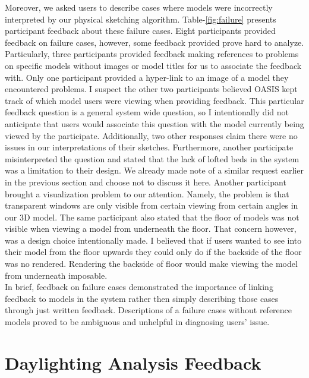 Moreover, we asked users to describe cases where models were incorrectly interpreted by our physical sketching algorithm.
Table-\ref{fig:failure} presents participant feedback about these failure cases.
Eight participants provided feedback on failure cases, however, some feedback provided prove hard to analyze.
Particularly, three participants provided feedback making references to problems on specific models without images or model titles for us to associate the feedback with.
Only one participant provided a hyper-link to an image of a model they encountered problems.
I suspect the other two participants believed OASIS kept track of which model users were viewing when providing feedback.
This particular feedback question is a general system wide question, so I intentionally did not anticipate that users would associate this question with the model currently being viewed by the participate.
Additionally, two other responses claim there were no issues in our interpretations of their sketches.
Furthermore, another participate misinterpreted the question and stated that the lack of lofted beds in the system was a limitation to their design.
We already made note of a similar request earlier in the previous section and choose not to discuss it here.
Another participant brought a visualization problem to our attention. 
Namely, the problem is that transparent windows are only visible from certain viewing from certain angles in our 3D model.
The same participant also stated that the floor of models was not visible when viewing a model from underneath the floor.
That concern however, was a design choice intentionally made.
I believed that if users wanted to see into their model from the floor upwards they could only do if the backside of the floor was no rendered.
Rendering the backside of floor would make viewing the model from underneath imposable.\\

In brief, feedback on failure cases demonstrated the importance of linking feedback to models in the system rather then  simply describing those cases through just written feedback.
Descriptions of a failure cases without reference models proved to be ambiguous and unhelpful in  diagnosing users' issue.

\section{Daylighting Analysis Feedback}

